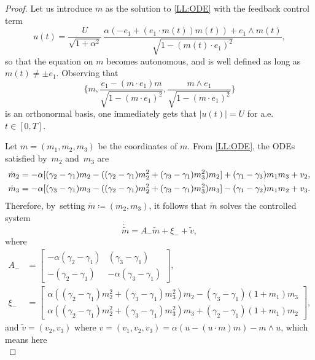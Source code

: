 \documentclass[10pt]{amsart}
\theoremstyle{definition}
\begin{document}
\begin{proof}
Let us introduce $m$ as the solution to \eqref{LL:ODE} with the feedback control term
\begin{equation*}
u (t) = \frac{U}{\sqrt{1 + \alpha^2}}\, \frac{\alpha (- e_1 + (e_1 \cdot m(t)) m(t)) + e_1 \wedge m(t)}{\sqrt{1- (m(t) \cdot e_1)^2}},
\end{equation*}
so that the equation on $m$ becomes autonomous, and is well defined as long as \hbox{$m (t) \neq \pm e_1$}. Observing that
\[
\biggl\{m,\frac{e_1-(m\cdot e_1)m}{\sqrt{1-(m\cdot e_1)^2}},\frac{m\wedge e_1}{\sqrt{1-(m\cdot e_1)^2}}\biggr\}
\]
is an orthonormal basis, one immediately gets that $|u(t)|=U$ for a.e. $t\in [0,T]$.

Let $m=(m_1,m_2,m_3)$ be the coordinates of $m$. From \eqref{LL:ODE}, the ODEs satisfied by~$m_2$ and~$m_3$ are
\begin{align*} \notag
\dot m_2 &= - \alpha [ (\gamma_2 - \gamma_1) m_2 - ((\gamma_2 - \gamma_1) m_2^2 + (\gamma_3 - \gamma_1) m_3^2) m_2 ] + (\gamma_1 - \gamma_3) m_1 m_3 + v_2, \\
\dot m_3 &= - \alpha [ (\gamma_3 - \gamma_1) m_3 - ((\gamma_2 - \gamma_1) m_2^2 + (\gamma_3 - \gamma_1) m_3^2) m_3 ] - (\gamma_1 - \gamma_2) m_1 m_2 + v_3.
\end{align*}
Therefore, by~setting $\widetilde{m} \coloneqq (m_2, m_3)$, it follows that $\widetilde{m}$ solves the controlled system
\begin{equation} \label{eq:ode_tilde_m_2}
\dot{\tilde{m}} = A_- \tilde{m} + \xi_- + \tilde v,
\end{equation}
where
\begin{align*}
A_- &=
\begin{bmatrix}
- \alpha (\gamma_2 - \gamma_1) & (\gamma_3 - \gamma_1) \\
- (\gamma_2 - \gamma_1) & - \alpha (\gamma_3 - \gamma_1)
\end{bmatrix}, \\
\xi_- &=
\begin{bmatrix}
\alpha ((\gamma_2 - \gamma_1) m_2^2 + (\gamma_3 - \gamma_1) m_3^2) m_2 - (\gamma_3 - \gamma_1) (1 + m_1) m_3 \\
\alpha ((\gamma_2 - \gamma_1) m_2^2 + (\gamma_3 - \gamma_1) m_3^2) m_3 + (\gamma_2 - \gamma_1) (1 + m_1) m_2
\end{bmatrix},
\end{align*}
and $\tilde v = (v_2, v_3)$ where $v = (v_1,v_2,v_3)=\alpha (u - (u \cdot m) m) - m \wedge u$, which means here
\begin{equation*}

\end{equation*}
\end{proof}
\end{document}
